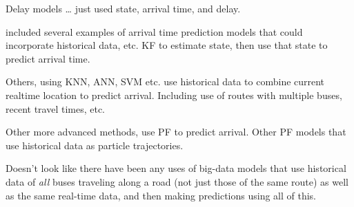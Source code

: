 \documentclass[12pt,a4paper]{article}
\begin{document}
Delay models \ldots
\cite{dailey:2001} just used state, arrival time, and delay.


\cite{cathey-dailey:2003} included several examples of arrival time prediction models
that could incorporate historical data, etc.
KF to estimate state, then use that state to predict arrival time.


Others, using KNN, ANN, SVM etc. use historical data to combine current
realtime location to predict arrival.
Including use of routes with multiple buses, recent travel times, etc.


Other more advanced methods, \cite{hans-etal:2015} use PF to predict arrival.
Other PF models that use historical data as particle trajectories.


Doesn't look like there have been any uses of big-data models that use
historical data of \emph{all} buses traveling along a road
(not just those of the same route) as well as the same real-time data,
and then making predictions using all of this.












\end{document}
